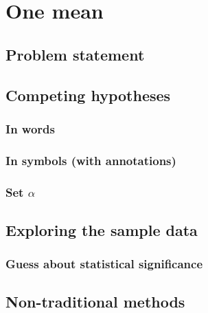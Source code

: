 \documentclass[
  12pt, krantz2,
]{krantz}
\begin{document}
\hypertarget{one-mean}{%
\section{One mean}\label{one-mean}}

\hypertarget{problem-statement}{%
\subsection{Problem statement}\label{problem-statement}}

\hypertarget{competing-hypotheses}{%
\subsection{Competing hypotheses}\label{competing-hypotheses}}

\hypertarget{in-words}{%
\subsubsection*{In words}\label{in-words}}


\hypertarget{in-symbols-with-annotations}{%
\subsubsection*{In symbols (with annotations)}\label{in-symbols-with-annotations}}


\hypertarget{set-alpha}{%
\subsubsection*{\texorpdfstring{Set \(\alpha\)}{Set \textbackslash alpha}}\label{set-alpha}}


\hypertarget{exploring-the-sample-data}{%
\subsection{Exploring the sample data}\label{exploring-the-sample-data}}

\hypertarget{guess-about-statistical-significance}{%
\subsubsection*{Guess about statistical significance}\label{guess-about-statistical-significance}}


\hypertarget{non-traditional-methods}{%
\subsection{Non-traditional methods}\label{non-traditional-methods}}
\end{document}
